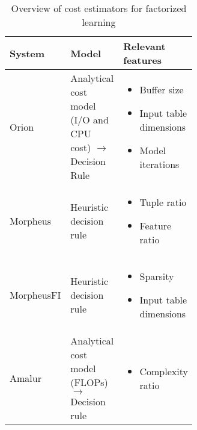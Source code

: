 \begin{table}[ht]
    \centering
    \begin{tabular}{lp{0.30\linewidth}p{0.32\linewidth}}
        \toprule
        System                                                       & Model                                                                & Relevant features                                                                                                                           \\ \midrule \midrule
        Orion      \cite{orion_learning_gen_lin_models}              & Analytical cost model (I/O and CPU cost) $\rightarrow$ Decision Rule & \begin{itemize}[noitemsep,topsep=0pt,leftmargin=0.3cm] \item Buffer size \item Input table dimensions \item Model iterations  \end{itemize} \\ \midrule
        Morpheus    \cite{morpheus}                                  & Heuristic decision rule                                              & \begin{itemize}[noitemsep,topsep=0pt,leftmargin=0.3cm] \item Tuple ratio \item Feature ratio  \end{itemize}                                 \\\midrule
        MorpheusFI  \cite{MorpheusFIEnablingOptimizingNonlinear2019} & Heuristic decision rule                                              & \begin{itemize}[noitemsep,topsep=0pt,leftmargin=0.3cm] \item Sparsity \item Input table dimensions \end{itemize}                            \\\midrule
        Amalur     \cite{schijndel_cost_estimation}                  & Analytical cost model (FLOPs) $\rightarrow$ Decision rule            & \begin{itemize}[noitemsep,topsep=0pt,leftmargin=00.3cm] \item Complexity ratio \end{itemize}                                                \\
        \bottomrule
    \end{tabular}
    \caption{Overview of cost estimators for factorized learning}
    \label{tab:cost_model_overview}
\end{table}

